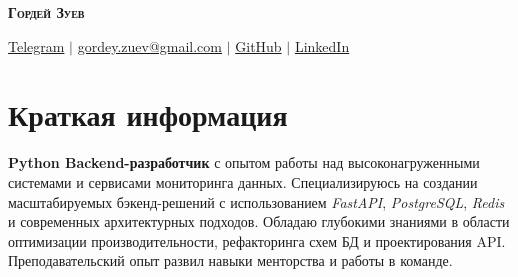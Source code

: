 \documentclass[letterpaper,11pt]{article}
\begin{document}
\begin{center}
    \textsc{\Huge{\textbf{Гордей Зуев}}} \\ \vspace{1pt}
    
    \href{{https://t.me/gordeyzuev}}{\textcolor{blue!50!black}{Telegram}} $|$
    \href{mailto:gordey.zuev@gmail.com}{\textcolor{blue!50!black} {gordey.zuev@gmail.com}} $|$
    \href{https://github.com/GordeyZuev}{\textcolor{blue!50!black}{GitHub}} $|$
    \href{{https://www.linkedin.com/in/gordey-zuev/}}{\textcolor{blue!50!black}{LinkedIn}}
\end{center}


\section{Краткая информация}
 \begin{itemize}[leftmargin=0.15in, label={}]
    \small{\item{
     \textbf{Python Backend-разработчик} с опытом работы над высоконагруженными системами и сервисами мониторинга данных. Специализируюсь на создании масштабируемых бэкенд-решений с использованием \textit{FastAPI}, \textit{PostgreSQL}, \textit{Redis} и современных архитектурных подходов. Обладаю глубокими знаниями в области оптимизации производительности, рефакторинга схем БД и проектирования API. Преподавательский опыт развил навыки менторства и работы в команде.
    }}
 \end{itemize}


\end{document}

